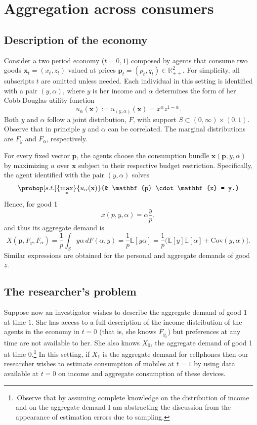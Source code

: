\documentclass[english, a4paper, 12pt]{article}
\begin{document}
\section{Aggregation across consumers} \label{sec:RepAg}

\subsection{Description of the economy} \label{ssec:RepAgDescr}
Consider a two period economy ($t = 0,1$) composed by agents that consume two goods $\mathbf{x}_{t} = (x_{t}, z_{t})$ valued at prices $\mathbf{p}_{t} = (p_{t}, q_{t}) \in \mathbb{R}^{2}_{++}$. For simplicity, all subscripts $t$ are omitted unless needed. Each individual in this setting is identified with a pair $(y,\alpha)$, where $y$ is her income and $\alpha$ determines the form of her Cobb-Douglas utility function
	$$u_{\alpha}(\mathbf{x}) := u_{(y,\alpha)}(\mathbf{x}) = x^{\alpha}z^{1-\alpha}.$$
Both $y$ and $\alpha$ follow a joint distribution, $F$, with support $S \subset (0,\infty) \times (0,1)$. Observe that in principle $y$ and $\alpha$ can be correlated. The marginal distributions are $F_{y}$ and $F_{\alpha}$, respectively. 

For every fixed vector $\mathbf{p}$, the agents choose the consumption bundle $\mathbf{x}(\mathbf{p}, y, \alpha)$ by maximizing $u$ over $\mathbf{x}$ subject to their respective budget restriction. Specifically, the agent identified with the pair $(y,\alpha)$ solves
	$$\probop[s.t.]{\max_{\mathbf{x}}}{u_{\alpha}(\mathbf{x})}
							{&	\mathbf{p} \cdot \mathbf{x} = y.}$$ 
Hence, for good 1
	$$x(p, y, \alpha) = \alpha \frac{y}{p},$$
and thus its aggregate demand is
	$$X(\mathbf{p}, F_{y}, F_{\alpha})
		= \frac{1}{p} \int_{S} y\alpha \,dF(\alpha,y)
		= \frac{1}{p}\mathbb{E}[y\alpha]
		= \frac{1}{p}\Big(\mathbb{E}[y]\mathbb{E}[\alpha] + \mathrm{Cov}(y,\alpha)\Big).
	$$
Similar expressions are obtained for the personal and aggregate demands of good $z$.

\subsection{The researcher's problem} \label{ssec:RepAgProblem}
Suppose now an investigator wishes to describe the aggregate demand of good 1 at time $1$. She has access to a full description of the income distribution of the agents in the economy in $t = 0$ (that is, she knows $F_{y_{0}}$) but preferences at any time are not available to her. She also knows $X_{0}$, the aggregate demand of good 1 at time $0$.\footnote{\,Observe that by assuming complete knowledge on the distribution of income and on the aggregate demand I am abstracting the discussion from the appearance of estimation errors due to sampling.} In this setting, if $X_{1}$ is the aggregate demand for cellphones then our researcher wishes to estimate consumption of mobiles at $t=1$ by using data available at $t=0$ on income and aggregate consumption of these devices.
\end{document}
